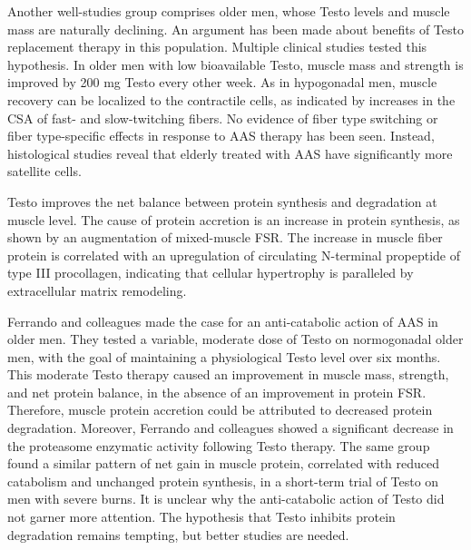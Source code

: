 \documentclass[12pt,english]{report}\usepackage[]{graphicx}\usepackage[]{color}
\begin{document}
Another well-studies group comprises older men, whose Testo levels
and muscle mass are naturally declining\citep{rosenberg1989summary,feldman2002age}.
An argument has been made about benefits of Testo replacement therapy
in this population. Multiple clinical studies tested this hypothesis.
In older men with low bioavailable Testo, muscle mass and strength
is improved by 200 mg Testo every other week\citep{morley1993effects,sih1997testosterone}.
As in hypogonadal men, muscle recovery can be localized to the contractile
cells, as indicated by increases in the CSA of fast- and slow-twitching
fibers\citep{sinha-hikim2006effects}. No evidence of fiber type switching
or fiber type-specific effects in response to AAS therapy has been
seen. Instead, histological studies reveal that elderly treated with
AAS have significantly more satellite cells\citep{sinha-hikim2006effects}. 

Testo improves the net balance between protein synthesis and degradation
at muscle level\citep{ferrando2002testosterone}. The cause of protein
accretion is an increase in protein synthesis, as shown by an augmentation
of mixed-muscle FSR\citep{sheffield-moore2011randomized}. The increase
in muscle fiber protein is correlated with an upregulation of circulating
N-terminal propeptide of type III procollagen\citep{bhasin2009n-terminal},
indicating that cellular hypertrophy is paralleled by extracellular
matrix remodeling.

Ferrando and colleagues made the case for an anti-catabolic action
of AAS in older men\citep{ferrando2003differential}. They tested
a variable, moderate dose of Testo on normogonadal older men, with
the goal of maintaining a physiological Testo level over six months.
This moderate Testo therapy caused an improvement in muscle mass,
strength, and net protein balance, in the absence of an improvement
in protein FSR. Therefore, muscle protein accretion could be attributed
to decreased protein degradation. Moreover, Ferrando and colleagues
showed a significant decrease in the proteasome enzymatic activity
following Testo therapy. The same group found a similar pattern of
net gain in muscle protein, correlated with reduced catabolism and
unchanged protein synthesis, in a short-term trial of Testo on men
with severe burns\citep{ferrando2001testosterone}. It is unclear
why the anti-catabolic action of Testo did not garner more attention.
The hypothesis that Testo inhibits protein degradation remains tempting,
but better studies are needed.
\end{document}
